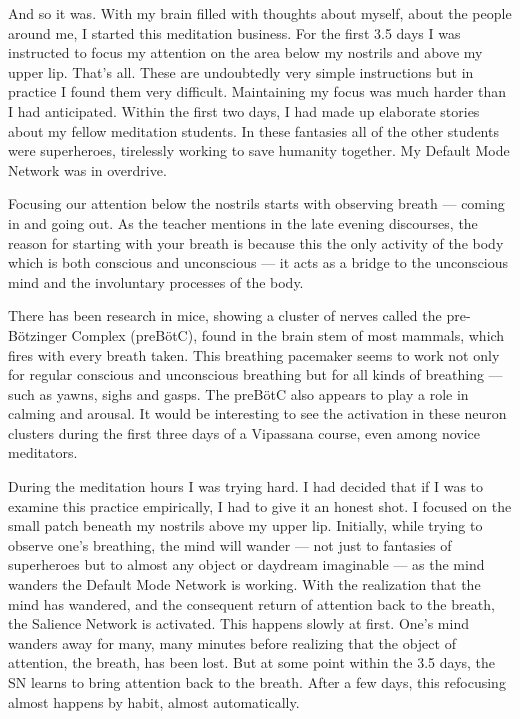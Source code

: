 \documentclass[a4paper, amsfonts, amssymb, amsmath, reprint, showkeys, nofootinbib, twoside]{revtex4-1}
\begin{document}
And so it was. With my brain filled with thoughts about myself, about the people
around me, I started this meditation business. For the first 3.5 days I was instructed
to focus my attention on the area below my nostrils and above my upper
lip. That's all. These are undoubtedly very simple instructions but in practice I
found them very difficult. Maintaining my focus was much harder than I had
anticipated. Within the first two days, I had made up elaborate stories about my
fellow meditation students. In these fantasies all of the other students were
superheroes, tirelessly working to save humanity together. My Default Mode Network
was in overdrive.

Focusing our attention below the nostrils starts with observing breath --- coming in
and going out. As the teacher mentions in the late evening discourses, the reason for
starting with your breath is because this the only activity of the body which is both
conscious and unconscious --- it acts as a bridge to the unconscious mind and the
involuntary processes of the body.

There has been research in mice, showing a cluster of nerves called the
pre-Bötzinger Complex (preBötC), found in the brain stem of most mammals, which fires
with every breath taken. This breathing pacemaker seems to work not only for regular
conscious and unconscious breathing but for all kinds of breathing --- such as yawns,
sighs and gasps. The preBötC also appears to play a role in calming and
arousal. \cite{prebotcgeneration} It would be interesting to see the activation in
these neuron clusters during the first three days of a Vipassana course, even among
novice meditators.

During the meditation hours I was trying hard. I had decided that if I was to examine this practice
empirically, I had to give it an honest shot. I focused on the small patch beneath my
nostrils above my upper lip. Initially, while trying to observe one's breathing, the
mind will wander --- not just to fantasies of superheroes but to almost any object or
daydream imaginable --- as the mind wanders the Default Mode Network is working. With
the realization that the mind has wandered, and the consequent return of attention
back to the breath, the Salience Network is
activated. This happens slowly at first. One's mind wanders away for many, many
minutes before realizing that the object of attention, the breath, has been lost. But
at some point within the 3.5 days, the SN learns to bring attention back to the breath. After a few days, this
refocusing almost happens by habit, almost automatically.
\end{document}
